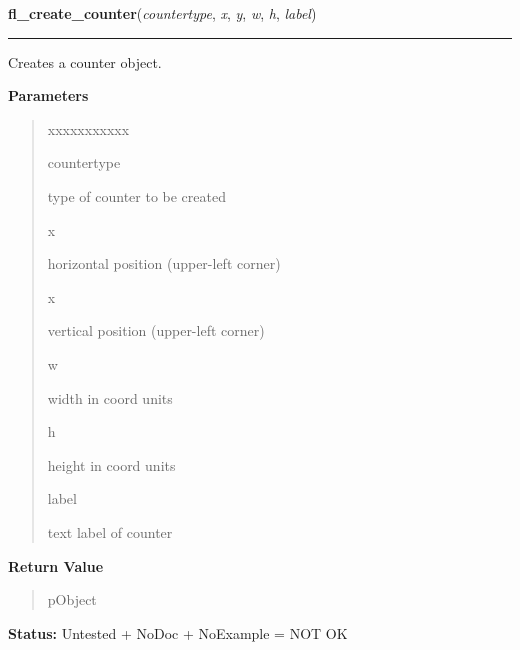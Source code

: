 \hspace{.8\funcindent}\begin{boxedminipage}{\funcwidth}

    \raggedright \textbf{fl\_create\_counter}(\textit{countertype}, \textit{x}, \textit{y}, \textit{w}, \textit{h}, \textit{label})

    \vspace{-1.5ex}

    \rule{\textwidth}{0.5\fboxrule}
\setlength{\parskip}{2ex}
    Creates a counter object.

\setlength{\parskip}{1ex}
      \textbf{Parameters}
      \vspace{-1ex}

      \begin{quote}
        \begin{Ventry}{xxxxxxxxxxx}

          \item[countertype]

          type of counter to be created

          \item[x]

          horizontal position (upper-left corner)

          \item[x]

          vertical position (upper-left corner)

          \item[w]

          width in coord units

          \item[h]

          height in coord units

          \item[label]

          text label of counter

        \end{Ventry}

      \end{quote}

      \textbf{Return Value}
    \vspace{-1ex}

      \begin{quote}
      pObject

      \end{quote}

\textbf{Status:} Untested + NoDoc + NoExample = NOT OK



    \end{boxedminipage}


